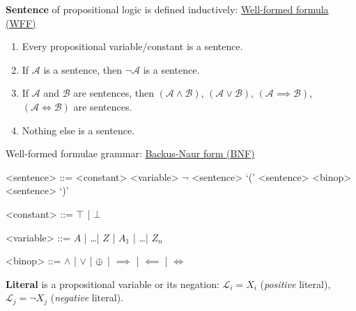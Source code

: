 \documentclass[a4paper,10pt]{article}
\begin{document}
\begin{terms}
    \item \textbf{Sentence} of propositional logic is defined inductively:
    \hfill\href{https://en.wikipedia.org/wiki/Well-formed_formula}{Well-formed formula (WFF)}

    \begin{enumerate}[left=6pt .. 18pt]
        \item Every propositional variable/constant is a sentence.

        \item If $\mathcal{A}$ is a sentence, then $\neg\mathcal{A}$ is a sentence.

        \item If $\mathcal{A}$ and $\mathcal{B}$ are sentences, then $(\mathcal{A} \land \mathcal{B})$, $(\mathcal{A} \lor \mathcal{B})$, $(\mathcal{A} \implies \mathcal{B})$, $(\mathcal{A} \iff \mathcal{B})$ are sentences.

        \item Nothing else is a sentence.
    \end{enumerate}

    \item Well-formed formulae grammar:
    \hfill\href{https://en.wikipedia.org/wiki/Backus-Naur_form}{Backus-Naur form (BNF)}

    \vspace{-2pt}
    \setlength{\grammarparsep}{0pt plus 4pt}
    \setlength{\grammarindent}{6em}
    \begin{grammar}
        <sentence> ::=
             <constant>
        \alt <variable>
        \alt $\neg$ <sentence>
        \alt `(' <sentence> <binop> <sentence> `)'

        <constant> ::=
            $\top$ | $\bot$

        <variable> ::=
            $A$ | \dots | $Z$ | $A_1$ | \dots | $Z_n$

        <binop> ::=
            $\land$ | $\lor$ | $\oplus$ | $\implies$ | $\impliedby$ | $\iff$
    \end{grammar}

    \item \textbf{Literal} is a propositional variable or its negation: $\mathcal{L}_i = X_i$ (\textit{positive} literal), $\mathcal{L}_j = \neg X_j$ (\textit{negative} literal).


\end{terms}
\end{document}
